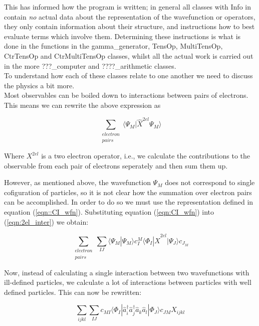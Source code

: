 \documentclass[12pt]{article}
\begin{document}
This has informed how the program is written; in general all classes with Info
in contain \emph{no} actual data about the representation of the wavefunction or operators,
they only contain information about their structure, and instructions how to best evaluate 
terms which involve them. Determining these instructions is what is done in the functions in the
gamma_generator, TensOp, MultiTensOp, CtrTensOp and CtrMultiTensOp classes, whilst all the actual
work is carried out in the more ???_computer and ????_arithmetic classes.\\

To understand how each of these classes relate to one another we need to discuss the physics a bit more.\\

Most observables can be boiled down to interactions between pairs of electrons. This means we can rewrite the above expression as

\begin{equation}
\sum_{\substack{electron \\ pairs}} \langle \Psi_{M} | \hat{X}^{2el} \Psi_{M} \rangle
\label{eqn:2el_inter}
\end{equation}

Where $X^{2el}$ is a two electron operator, i.e., we calculate the
contributions to the observable from each pair of electrons seperately and then
sum them up. 

\noindent However, as mentioned above, the wavefunction $\Psi_{M}$ does not
correspond to single cofiguration of particles, so it is not clear how the
summation over electron pairs can be accomplished. In order to do so we must
use the representation defined in equation (\ref{eqn::CI_wfn}). Substituting
equation (\ref{eqn:CI_wfn}) into (\ref{eqn:2el_inter}) we obtain:

\begin{equation}
\sum_{\substack{electron \\ pairs}}\sum_{IJ}
 \langle \Psi_{M} | \Psi_{M} \rangle c^{M}_{I}\langle \Phi_{I} | \hat{X}^{2el} | \Psi_{J} \rangle c_{J}_{M}
\label{eqn:2el_inter_2}
\end{equation}

Now, instead of calculating a single interaction between two wavefunctions with ill-defined particles,
we calculate a lot of interactions between particles with well defined particles. This can now be rewritten: 

\begin{equation}
\sum_{ijkl}\sum_{IJ} c_{MI}\langle \Phi_{I} | \hat{a}_{i}^{\dagger}\hat{a}_{j}^{\dagger}\hat{a}_{k}\hat{a}_{l} | \Phi_{J} \rangle c_{JM} X_{ijkl}
\label{eqn:2el_expectation}
\end{equation}
\end{document}
